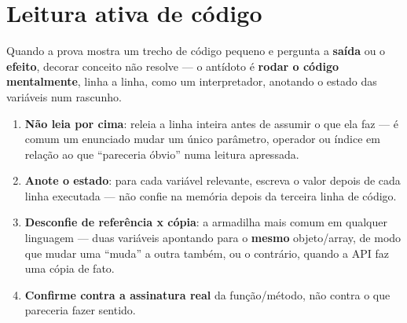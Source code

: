 \section{Leitura ativa de código}
\label{sec:leitura-ativa-programacao-teoria}

\begin{conceito}
Quando a prova mostra um trecho de código pequeno e pergunta a
\textbf{saída} ou o \textbf{efeito}, decorar conceito não resolve --- o
antídoto é \textbf{rodar o código mentalmente}, linha a linha, como um
interpretador, anotando o estado das variáveis num rascunho.

\begin{enumerate}
\item \textbf{Não leia por cima}: releia a linha inteira antes de assumir
o que ela faz --- é comum um enunciado mudar um único parâmetro, operador
ou índice em relação ao que “pareceria óbvio” numa leitura apressada.
\item \textbf{Anote o estado}: para cada variável relevante, escreva o
valor depois de cada linha executada --- não confie na memória depois da
terceira linha de código.
\item \textbf{Desconfie de referência x cópia}: a armadilha mais comum em
qualquer linguagem --- duas variáveis apontando para o \textbf{mesmo}
objeto/array, de modo que mudar uma “muda” a outra também, ou o contrário,
quando a API faz uma cópia de fato.
\item \textbf{Confirme contra a assinatura real} da função/método, não
contra o que pareceria fazer sentido.
\end{enumerate}
\end{conceito}

